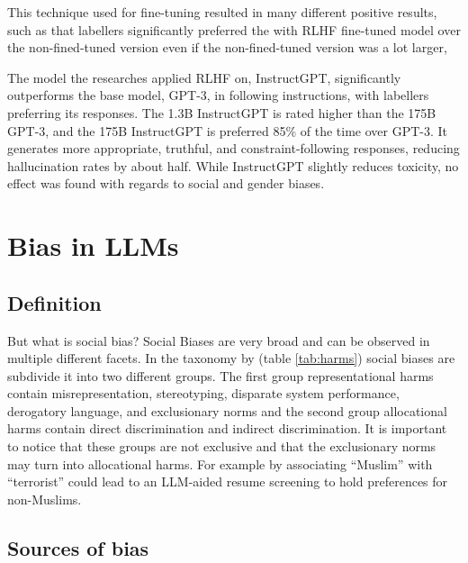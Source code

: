 This technique used for fine-tuning resulted in many different positive results, such as that labellers significantly preferred the with RLHF fine-tuned model over the non-fined-tuned version even if the non-fined-tuned version was a lot larger, 

The model the researches applied RLHF on, InstructGPT, significantly outperforms the base model, GPT-3, in following instructions, with labellers preferring its responses. The 1.3B InstructGPT is rated higher than the 175B GPT-3, and the 175B InstructGPT is preferred 85\% of the time over GPT-3. It generates more appropriate, truthful, and constraint-following responses, reducing hallucination rates by about half. While InstructGPT slightly reduces toxicity, no effect was found with regards to social and gender biases\cite{ouyang2022training}.






\section{Bias in LLMs}
\label{sec:gender-bias-in-llm}

\subsection{Definition}

But what is social bias? Social Biases are very broad and can be observed in multiple different facets. In the taxonomy by \citet{gallegos_bias_2024} (table \ref{tab:harms}) social biases are subdivide it into two different groups. The first group representational harms contain misrepresentation, stereotyping, disparate system performance, derogatory language, and exclusionary norms and the second group allocational harms contain direct discrimination and indirect discrimination. It is important to notice that these groups are not exclusive and that the exclusionary norms may turn into allocational harms. For example by associating “Muslim” with “terrorist” could lead to an LLM-aided resume screening to hold preferences for non-Muslims. 



\subsection{Sources of bias}


